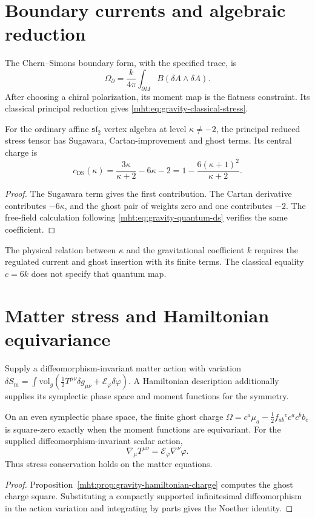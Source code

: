 \chapter{Boundary currents and algebraic reduction}
The Chern--Simons boundary form, with the specified trace, is
\[
 \Omega_\partial=\frac{k}{4\pi}
       \int_{\partial M}B(\delta A\wedge\delta A).
\]
After choosing a chiral polarization, its moment map is the
flatness constraint.
Its classical principal reduction gives
\eqref{mht:eq:gravity-classical-stress}.

\begin{theorem}
For the ordinary affine $\mathfrak{sl}_2$ vertex algebra at
level $\kappa\ne-2$, the principal reduced stress tensor has
Sugawara, Cartan-improvement and ghost terms.
Its central charge is
\[
 c_{\mathrm{DS}}(\kappa)
 =\frac{3\kappa}{\kappa+2}-6\kappa-2
 =1-\frac{6(\kappa+1)^2}{\kappa+2}.
\]
\end{theorem}
\begin{proof}
The Sugawara term gives the first contribution.
The Cartan derivative contributes $-6\kappa$, and the ghost
pair of weights zero and one contributes $-2$.
The free-field calculation following
\eqref{mht:eq:gravity-quantum-ds} verifies the same coefficient.
\end{proof}

The physical relation between $\kappa$ and the gravitational
coefficient $k$ requires the regulated current and ghost
insertion with its finite terms.
The classical equality $c=6k$ does not specify that quantum map.

\chapter{Matter stress and Hamiltonian equivariance}
Supply a diffeomorphism-invariant matter action with variation
$\delta S_{\mathrm m}
=\int\mathrm{vol}_g(\tfrac12T^{\mu\nu}\delta g_{\mu\nu}
+\mathcal E_\varphi\delta\varphi)$.
A Hamiltonian description additionally supplies its symplectic
phase space and moment functions for the symmetry.

\begin{theorem}
On an even symplectic phase space, the finite ghost charge
$\Omega=c^a\mu_a-\frac12f_{ab}{}^cc^ac^bb_c$ is square-zero
exactly when the moment functions are equivariant.
For the supplied diffeomorphism-invariant scalar action,
\[
 \nabla_\mu T^{\mu\nu}=\mathcal E_\varphi\nabla^\nu\varphi.
\]
Thus stress conservation holds on the matter equations.
\end{theorem}
\begin{proof}
Proposition~\ref{mht:prop:gravity-hamiltonian-charge} computes
the ghost charge square.
Substituting a compactly supported infinitesimal diffeomorphism
in the action variation and integrating by parts gives the
Noether identity.
\end{proof}

